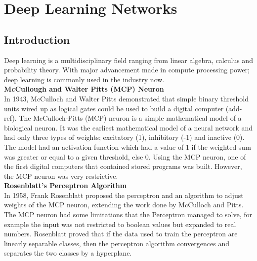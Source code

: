 \chapter{Deep Learning Networks}
\section{Introduction}
Deep learning is a multidisciplinary field ranging from linear algebra, calculus and probability theory. With major advancement made in compute processing power; deep learning is commonly used in the industry now.
\vspace{5mm}
\\
\noindent\textbf{McCullough and Walter Pitts (MCP) Neuron}\\
In 1943, McCulloch and Walter Pitts demonstrated that simple binary threshold units wired up as logical gates could be used to build a digital computer (add-ref). The McCulloch-Pitts (MCP) neuron is a simple mathematical model of a biological neuron. It was the earliest mathematical model of a neural network and had only three types of weights; excitatory (1), inhibitory (-1) and inactive (0). The model had an activation function which had a value of 1 if the weighted sum was greater or equal to a given threshold, else 0. Using the MCP neuron, one of the first digital computers that contained stored programs was built. However, the MCP neuron was very restrictive.
\vspace{5mm}
\\
\noindent\textbf{Rosenblatt’s Perceptron Algorithm}\\
In 1958, Frank Rosenblatt proposed the perceptron and an algorithm to adjust weights of the MCP neuron, extending the work done by McCulloch and Pitts. The MCP neuron had some limitations that the Perceptron managed to solve, for example the input was not restricted to boolean values but expanded to real numbers. Rosenblatt proved that if the data used to train the perceptron are linearly separable classes, then the perceptron algorithm convergences and separates the two classes by a hyperplane.
\vspace{5mm}
